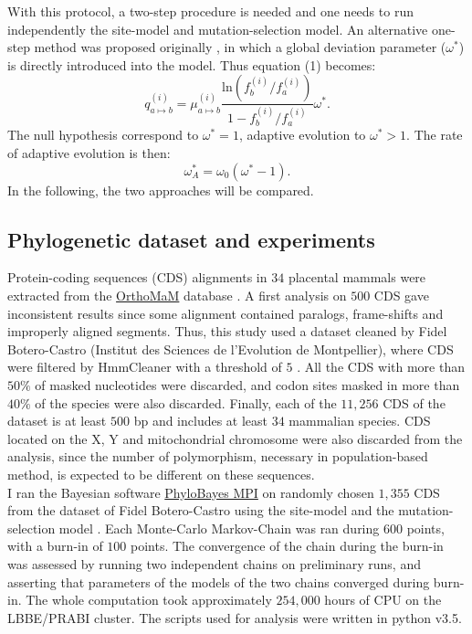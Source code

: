 \documentclass[10pt]{article}
\begin{document}
\begin{multicols}{2}
	With this protocol, a two-step procedure is needed and one needs to run independently the site-model and mutation-selection model. An alternative one-step method was proposed originally \cite{Rodrigue2016}, in which a global deviation parameter ($\omega^*$) is directly introduced into the model. Thus equation (1) becomes:
	\begin{equation}
	q_{a \mapsto b}^{(i)} =  \mu_{a \mapsto b}^{(i)} \dfrac{\mathrm{ln}(f_b^{(i)} / f_a^{(i)})}{1 - f_b^{(i)} / f_a^{(i)}} \omega^* .
	\end{equation}
	The null hypothesis correspond to $\omega^*=1$, adaptive evolution to $\omega^*>1$. The rate of adaptive evolution is then:
	\begin{equation}
		\omega_A^* = \omega_0 (\omega^* - 1 ).
	\end{equation}
	In the following, the two approaches will be compared.

	\subsection*{Phylogenetic dataset and experiments}
	Protein-coding sequences (CDS) alignments in $34$ placental mammals were extracted from the \href{http://www.orthomam.univ-montp2.fr}{OrthoMaM} database \cite{ranwez_orthomam:_2007, douzery_orthomam_2014}. A first analysis on $500$ CDS gave inconsistent results since some alignment contained paralogs, frame-shifts and improperly aligned segments. Thus, this study used a dataset cleaned by Fidel Botero-Castro (Institut des Sciences de l'Evolution de Montpellier), where CDS were filtered by HmmCleaner with a threshold of $5$ \cite{di_franco_detecting_2017}. All the CDS with more than $50\%$ of masked nucleotides were discarded, and codon sites masked in more than $40\%$ of the species were also discarded. Finally, each of the $11,256$ CDS of the dataset is at least $500$ bp and includes at least $34$ mammalian species. CDS located on the X, Y and mitochondrial chromosome were also discarded from the analysis, since the number of polymorphism, necessary in population-based method, is expected to be different on these sequences.\\
	
	I ran the Bayesian software \href{https://github.com/bayesiancook/pbmpi2}{PhyloBayes MPI} on randomly chosen $1,355$ CDS from the dataset of Fidel Botero-Castro using the site-model \cite{lartillot_phylobayes_2013} and the mutation-selection model \cite{rodrigue_site-heterogeneous_2014}. Each Monte-Carlo Markov-Chain was ran during $600$ points, with a burn-in of $100$ points. The convergence of the chain during the burn-in was assessed by running two independent chains on preliminary runs, and asserting that parameters of the models of the two chains converged during burn-in. The whole computation took approximately $254,000$ hours of CPU on the LBBE/PRABI cluster. The scripts used for analysis were written in python v3.5.
	

\end{multicols}
\end{document}
